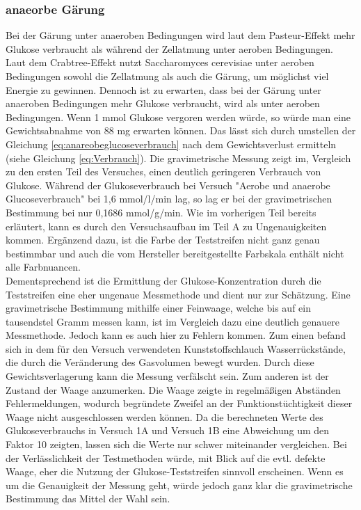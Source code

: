\documentclass[10pt,a4paper]{article}
\begin{document}
	\subsubsection{anaeorbe Gärung}	
	Bei der Gärung unter anaeroben Bedingungen wird laut dem Pasteur-Effekt mehr Glukose verbraucht als während der Zellatmung unter aeroben Bedingungen. Laut dem Crabtree-Effekt nutzt Saccharomyces cerevisiae unter aeroben Bedingungen sowohl die Zellatmung als auch die Gärung, um möglichst viel Energie zu gewinnen. Dennoch ist zu erwarten, dass bei der Gärung unter anaeroben Bedingungen mehr Glukose verbraucht, wird als unter aeroben Bedingungen. Wenn 1 mmol Glukose vergoren werden würde, so würde man eine Gewichtsabnahme von 88 mg erwarten können. Das lässt sich durch umstellen der Gleichung  \ref{eq:anareobeglucoseverbrauch} nach dem Gewichtsverlust ermitteln (siehe Gleichung  \ref{eq:Verbrauch}). Die gravimetrische Messung zeigt im, Vergleich zu den ersten Teil des Versuches, einen deutlich geringeren Verbrauch von Glukose. Während der Glukoseverbrauch bei Versuch "Aerobe und anaerobe Glucoseverbrauch" bei 1,6 mmol/l/min lag, so lag er bei der gravimetrischen Bestimmung bei nur 0,1686 mmol/g/min. Wie im vorherigen Teil bereits erläutert, kann es durch den Versuchsaufbau im Teil A zu Ungenauigkeiten kommen. Ergänzend dazu, ist die Farbe der Teststreifen nicht ganz genau bestimmbar und auch die vom Hersteller bereitgestellte Farbskala enthält nicht alle Farbnuancen.\\ Dementsprechend ist die Ermittlung der Glukose-Konzentration durch die Teststreifen eine eher ungenaue Messmethode und dient nur zur Schätzung. Eine gravimetrische Bestimmung mithilfe einer Feinwaage, welche bis auf ein tausendstel Gramm messen kann, ist im Vergleich dazu eine deutlich genauere Messmethode. Jedoch kann es auch hier zu Fehlern kommen. Zum einen befand sich in dem für den Versuch verwendeten Kunststoffschlauch Wasserrückstände, die durch die Veränderung des Gasvolumen bewegt wurden. Durch diese Gewichtsverlagerung kann die Messung verfälscht sein. Zum anderen ist der Zustand der Waage anzumerken. Die Waage zeigte in regelmäßigen Abständen Fehlermeldungen, wodurch begründete Zweifel an der Funktionstüchtigkeit dieser Waage nicht ausgeschlossen werden können. Da die berechneten Werte des Glukoseverbrauchs in Versuch 1A und Versuch 1B eine Abweichung um den Faktor 10 zeigten, lassen sich die Werte nur schwer miteinander vergleichen. Bei der Verlässlichkeit der Testmethoden würde, mit Blick auf die evtl. defekte Waage, eher die Nutzung der Glukose-Teststreifen sinnvoll erscheinen. Wenn es um die Genauigkeit der Messung geht, würde jedoch ganz klar die gravimetrische Bestimmung das Mittel der Wahl sein.
	
\end{document}
